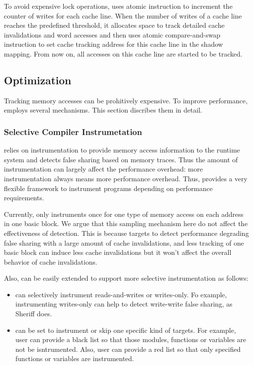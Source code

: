 To avoid expensive lock operations,  uses atomic instruction to increment 
the counter of writes for each cache line. 
When the number of writes of a cache line reaches the predefined threshold,
it allocates space to track detailed cache invalidations and word accesses and then 
uses atomic compare-and-swap instruction to set cache tracking address for this cache line in
the shadow mapping. From now on, all accesses on this cache line are started to be tracked.

\subsection{Optimization}
\label{optimization}
Tracking memory accesses can be prohitively expensive. To improve 
performance,  employs several mechanisms. This section discribes
them in detail.

\subsubsection{Selective Compiler Instrumetation}
 relies on instrumentation to provide memory access information to the runtime system 
and detects false sharing based on memory traces. 
Thus the amount of instrumentation can largely affect the performance overhead: more 
instrumentation always means more performance overhead. 
Thus,  provides a very flexible framework to instrument programs depending on performance requirements. 

Currently, \Defaults{} only instruments once for one type of memory access on each address 
in one basic block. 
We argue that this sampling mechanism here do not affect the effectiveness of detection. 
This is because \Defaults{} targets to detect performance degrading false sharing with a large amount of cache invalidations,
and less tracking of one basic block can induce less cache invalidations but it won't affect the overall behavior of cache invalidations. 

Also,  can be easily extended to support more selective instrumentation as follows:
\begin{itemize}
\item
\Defaults{} can selectively instrument reads-and-writes or writes-only. Fo example, instrumenting writes-only can help to detect write-write false sharing, as Sheriff does. 
\item
\Defaults{} can be set to instrument or skip one specific kind of targets. For example, user can provide a black list so that those modules,
functions or variables are not be isntrumented. Also, user can provide a red list so that only specified functions or variables are instrumented. 
\end{itemize}

